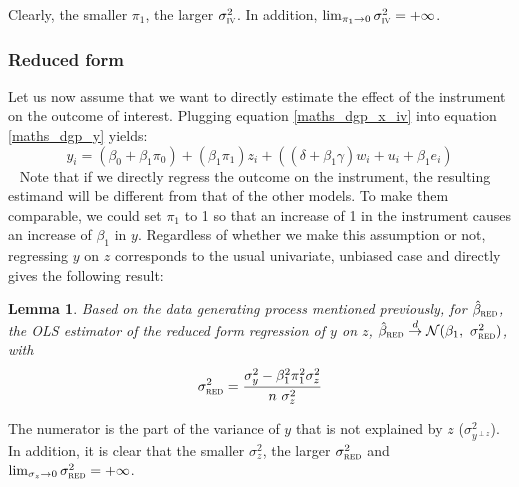\documentclass[usletter, 12pt]{article}
\newtheorem{lemma}{Lemma}
\begin{document}
			Clearly, the smaller $\pi_{1}$, the larger $\sigma_{\textsc{iv}}^{2}$. In addition, $\lim_{\pi_{1}\to 0} \sigma_{\textsc{iv}}^{2} = + \infty$.
			

				 

		\subsubsection{Reduced form}
		
			Let us now assume that we want to directly estimate the effect of the instrument on the outcome of interest. Plugging equation \ref{maths_dgp_x_iv} into equation \ref{maths_dgp_y} yields:			
				\[
					y_{i} = (\beta_{0} + \beta_{1}\pi_0) + (\beta_{1}\pi_{1}) z_{i} + ((\delta + \beta_{1}\gamma) w_{i} + u_{i} + \beta_{1}e_{i})
				\]
				~
				Note that if we directly regress the outcome on the instrument, the resulting estimand will be different from that of the other models. To make them comparable, we could set $\pi_{1}$ to 1 so that an increase of 1 in the instrument causes an increase of $\beta_{1}$ in $y$. Regardless of whether we make this assumption or not, regressing $y$ on $z$ corresponds to the usual univariate, unbiased case and directly gives the following result:
				
				\begin{lemma}\label{lemma_red}
					Based on the data generating process mentioned previously, for $\hat{\beta}_{\textsc{red}}$, the OLS estimator of the reduced form regression of $y$ on $z$,  $\hat{\beta}_{\textsc{red}} \overset{d}{\to} \mathcal{N}(\beta_{1}, \ \sigma_{\textsc{red}}^{2})$, with
					\[
						\sigma_{\textsc{red}}^{2} = \dfrac{\sigma_{y}^{2} - \beta_{1}^{2}\pi_{1}^{2}\sigma_{z}^{2}}{n \ \sigma_{z}^{2}}
					\]
				\end{lemma}
				
				The numerator is the part of the variance of $y$ that is not explained by $z$ ($\sigma^{2}_{y^{\perp z}}$). In addition, it is clear that the smaller $\sigma_{z}^{2}$, the larger $\sigma_{\textsc{red}}^{2}$ and $\lim_{\sigma_{z}\to 0} \sigma_{\textsc{red}}^{2} = + \infty$.\\
				
\end{document}
